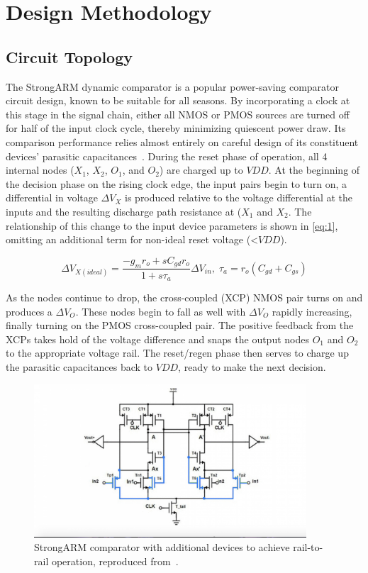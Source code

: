 \documentclass[11pt,letterpaper]{article}
\begin{document}
\section{Design Methodology}

\subsection{Circuit Topology}

The StrongARM dynamic comparator is a popular power-saving comparator circuit design, known to be suitable for all seasons. By incorporating a clock at this stage in the signal chain, either all NMOS or PMOS sources are turned off for half of the input clock cycle, thereby minimizing quiescent power draw. Its comparison performance relies almost entirely on careful design of its constituent devices' parasitic capacitances~\cite{Razavi2015}. During the reset phase of operation, all 4 internal nodes (\(X_1\), \(X_2\), \(O_1\), and \(O_2\)) are charged up to \(VDD\). At the beginning of the decision phase on the rising clock edge, the input pairs begin to turn on, a differential in voltage \(\Delta V_X\) is produced relative to the voltage differential at the inputs and the resulting discharge path resistance at (\(X_1\) and \(X_2\). The relationship of this change to the input device parameters is shown in \cref{eq:1}, omitting an additional term for non-ideal reset voltage (<\(VDD\)).

\begin{equation}
    \Delta V_{X(ideal)} = \frac{-g_m r_o + sC_{gd}r_o}{1+s\tau_a}\Delta V_{in},\; \tau_a = r_o(C_{gd}+C_{gs})
    \label{eq:1}
\end{equation}

As the nodes continue to drop, the cross-coupled (XCP) NMOS pair turns on and produces a \(\Delta V_O\). These nodes begin to fall as well with \(\Delta V_O\) rapidly increasing, finally turning on the PMOS cross-coupled pair. The positive feedback from the XCPs takes hold of the voltage difference and snaps the output nodes \(O_1\) and \(O_2\) to the appropriate voltage rail. The reset/regen phase then serves to charge up the parasitic capacitances back to \(VDD\), ready to make the next decision.

 \begin{figure}[htbp!]
		\centering
		\includegraphics[width=4in]{images/rtrcomp.png}
		\caption{StrongARM comparator with additional devices to achieve rail-to-rail operation, reproduced from~\cite{Qadasi2020}.}
		\label{Fig:rtrcomp}
	\end{figure}
\end{document}

